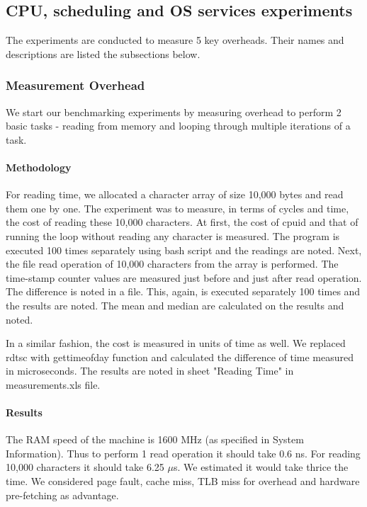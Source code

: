 \documentclass[conference]{IEEEtran}
\begin{document}


\subsection{CPU, scheduling and OS services experiments}

The experiments are conducted to measure 5 key overheads. Their names and descriptions are listed the subsections below.

\subsubsection{Measurement Overhead}

We start our benchmarking experiments by measuring overhead to perform 2 basic tasks - reading from memory and looping through multiple iterations of a task.

\paragraph{Methodology}

For reading time, we allocated a character array of size 10,000 bytes and read them one by one. The experiment was to measure, in terms of cycles and time, the cost of reading these 10,000 characters. At first, the cost of cpuid and that of running the loop without reading any character is measured.
The program is executed 100 times separately using bash script and the readings are noted. Next, the file read operation of 10,000 characters from the array is performed. The time-stamp counter values are measured just before and just after read operation. The difference is noted in a file. This, again, is executed separately 100 times and the results are noted. The mean and median are calculated on the results and noted.
\par In a similar fashion, the cost is measured in units of time as well. We replaced rdtsc with gettimeofday function and calculated the difference of time measured in microseconds. The results are noted in sheet "Reading Time" in measurements.xls file. 

\paragraph{Results}

The RAM speed of the machine is 1600 MHz (as specified in System Information). 
Thus to perform 1 read operation it should take 0.6 ns. 
For reading 10,000 characters it should take 6.25 $\mu$s. 
We estimated it would take thrice the time. We considered page fault, cache miss, TLB miss for overhead and hardware pre-fetching as advantage.
\end{document}
